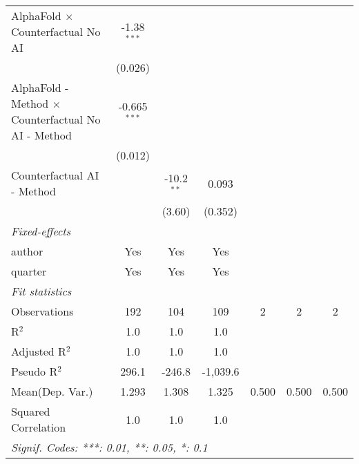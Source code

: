 \begin{tabular}{lcccccc}
   AlphaFold $\times$ Counterfactual No AI                    & -1.38$^{***}$  &                &                &     &     &   \\   
                                                              & (0.026)        &                &                &     &     &   \\   
   AlphaFold - Method $\times$ Counterfactual No AI - Method  & -0.665$^{***}$ &                &                &     &     &   \\   
                                                              & (0.012)        &                &                &     &     &   \\   
   Counterfactual AI - Method                                 &                & -10.2$^{**}$   & 0.093          &     &     &   \\   
                                                              &                & (3.60)         & (0.352)        &     &     &   \\   
   \midrule
   \emph{Fixed-effects}\\
   author                                                     & Yes            & Yes            & Yes            &     &     & \\  
   quarter                                                    & Yes            & Yes            & Yes            &     &     & \\  
   \midrule
   \emph{Fit statistics}\\
   Observations                                               & 192            & 104            & 109            & 2   & 2   & 2\\  
   R$^2$                                                      & 1.0            & 1.0            & 1.0            &     &     & \\  
   Adjusted R$^2$                                             & 1.0            & 1.0            & 1.0            &     &     & \\  
   Pseudo R$^2$                                               & 296.1          & -246.8         & -1,039.6       &     &     & \\  
Mean(Dep. Var.) & 1.293 & 1.308 & 1.325 & 0.500 & 0.500 & 0.500 \\
   Squared Correlation                                        & 1.0            & 1.0            & 1.0            &     &     & \\  
   \midrule \midrule
   \multicolumn{7}{l}{\emph{Signif. Codes: ***: 0.01, **: 0.05, *: 0.1}}\\
\end{tabular}
\par\endgroup
